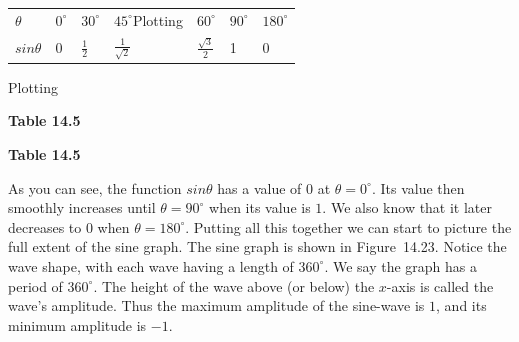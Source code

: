 \begin{table}[H]
\begin{center}
\label{m39414*id84073}
\noindent
{}
\tablelasttail{}
\begin{xtabular}[t]{|l|l|l|l|l|l|l|}\hline
    $\theta $
    &
    ${0}^{\circ }$
    &
    ${30}^{\circ }$
    &
    ${45}^{\circ }$Plotting 
    &
    ${60}^{\circ }$
    &
    ${90}^{\circ }$
    &
    ${180}^{\circ }$
\tabularnewline{}
    $sin\theta $
    &
0 &
    $\frac{1}{2}$
    &
    $\frac{1}{\sqrt{2}}$
    &
    $\frac{\sqrt{3}}{2}$
    &
1 &
0%
\tabularnewline{}
\end{xtabular}
\end{center}Plotting 
\begin{center}{\small\bfseries Table 14.5}\end{center}
\begin{caption}{\small\bfseries Table 14.5}\end{caption}
\end{table}
\par
As you can see, the function $sin\theta $ has a value of $0$ at $\theta ={0}^{\circ }$. Its value then smoothly increases until $\theta ={90}^{\circ }$ when its value is $1$. We also know that it later decreases to $0$ when $\theta ={180}^{\circ }$. Putting all this together we can start to picture the full extent of the sine graph. The sine graph is shown in Figure~14.23. Notice the wave shape, with each wave having a length of ${360}^{\circ }$. We say the graph has a period of ${360}^{\circ }$. The height of the wave above (or below) the $x$-axis is called the wave's amplitude. Thus the maximum amplitude of the sine-wave is $1$, and its minimum amplitude is $-1$.\par 
\setcounter{subfigure}{0}
